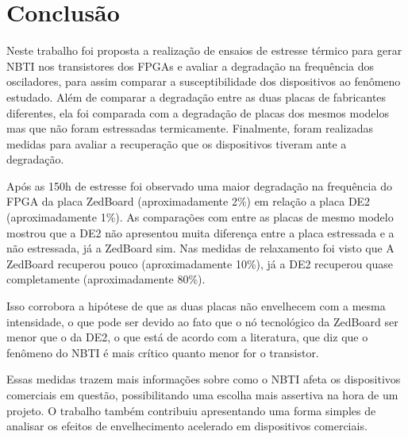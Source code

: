 \chapter{Conclusão}
\label{Conclusao}

Neste trabalho foi proposta a realização de ensaios de estresse térmico para gerar NBTI nos transistores dos FPGAs e avaliar a degradação na frequência dos osciladores, para assim comparar a susceptibilidade dos dispositivos ao fenômeno estudado. Além de comparar a degradação entre as duas placas de fabricantes diferentes, ela foi comparada com a degradação de placas dos mesmos modelos mas que não foram estressadas termicamente. Finalmente, foram realizadas medidas para avaliar a recuperação que os dispositivos tiveram ante a degradação.

Após as 150h de estresse foi observado uma maior degradação na frequência do FPGA da placa ZedBoard (aproximadamente 2\%) em relação a placa DE2 (aproximadamente 1\%). As comparações com entre as placas de mesmo modelo mostrou que a DE2 não apresentou muita diferença entre a placa estressada e a não estressada, já a ZedBoard sim. Nas medidas de relaxamento foi visto que A ZedBoard recuperou pouco (aproximadamente 10\%), já a DE2 recuperou quase completamente (aproximadamente 80\%).

Isso corrobora a hipótese de que as duas placas não envelhecem com a mesma intensidade, o que pode ser devido ao fato que o nó tecnológico da ZedBoard ser menor que o da DE2, o que está de acordo com a literatura, que diz que o fenômeno do NBTI é mais crítico quanto menor for o transistor.


Essas medidas trazem mais informações sobre como o NBTI afeta os dispositivos comerciais em questão, possibilitando uma escolha mais assertiva na hora de um projeto. O trabalho também contribuiu apresentando uma forma simples de analisar os efeitos de envelhecimento acelerado em dispositivos comerciais.

